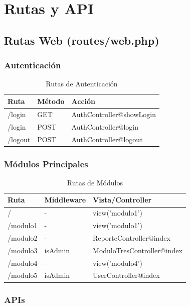 \documentclass[12pt,a4paper]{article}
\begin{document}
\newpage

\section{Rutas y API}

\subsection{Rutas Web (routes/web.php)}

\subsubsection{Autenticación}

\begin{table}[H]
\centering
\begin{tabular}{|l|l|l|}
\hline
\textbf{Ruta} & \textbf{Método} & \textbf{Acción} \\
\hline
/login & GET & AuthController@showLogin \\
/login & POST & AuthController@login \\
/logout & POST & AuthController@logout \\
\hline
\end{tabular}
\caption{Rutas de Autenticación}
\end{table}

\subsubsection{Módulos Principales}

\begin{table}[H]
\centering
\begin{tabular}{|l|l|l|}
\hline
\textbf{Ruta} & \textbf{Middleware} & \textbf{Vista/Controller} \\
\hline
/ & - & view('modulo1') \\
/modulo1 & - & view('modulo1') \\
/modulo2 & - & ReporteController@index \\
/modulo3 & isAdmin & ModuloTresController@index \\
/modulo4 & - & view('modulo4') \\
/modulo5 & isAdmin & UserController@index \\
\hline
\end{tabular}
\caption{Rutas de Módulos}
\end{table}

\subsubsection{APIs}
\end{document}
